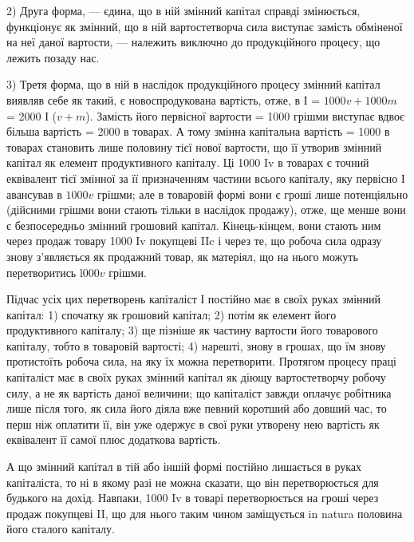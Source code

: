 2) Друга форма, — єдина, що в ній змінний капітал справді змінюється,
функціонує як змінний, що в ній вартостетворча сила виступає замість
обміненої на неї даної вартости, — належить виключно до продукційного
процесу, що лежить позаду нас.

3) Третя форма, що в ній в наслідок продукційного процесу змінний
капітал виявляв себе як такий, є новоспродукована вартість, отже,
в І = $1000 v + 1000 m$ = 2000 І ($v + m$). Замість його первісної вартости =
1000 грішми виступає вдвоє більша вартість = 2000 в товарах.
А тому змінна капітальна вартість = 1000 в товарах становить лише
половину тієї нової вартости, що її утворив змінний капітал як елемент
продуктивного капіталу. Ці 1000 Iv в товарах є точний еквівалент тієї
змінної за її призначенням частини всього капіталу, яку первісно І авансував
в $1000v$ грішми; але в товаровій формі вони є гроші лише потенціяльно
(дійсними грішми вони стають тільки в наслідок продажу), отже,
ще менше вони є безпосередньо змінний грошовий капітал. Кінець-кінцем,
вони стають ним через продаж товару 1000 Iv покупцеві IIc і через
те, що робоча сила одразу знову з’являється як продажний товар, як
матеріял, що на нього можуть перетворитись l$000v$ грішми.

Підчас усіх цих перетворень капіталіст І постійно має в своїх руках
змінний капітал: 1) спочатку як грошовий капітал; 2) потім як елемент
його продуктивного капіталу; 3) ще пізніше як частину вартости його
товарового капіталу, тобто в товаровій вартості; 4) нарешті, знову в грошах,
що їм знову протистоїть робоча сила, на яку їх можна перетворити.
Протягом процесу праці капіталіст має в своїх руках змінний капітал як
діющу вартостетворчу робочу силу, а не як вартість даної величини;
що капіталіст завжди оплачує робітника лише після того, як сила його
діяла вже певний коротший або довший час, то перш ніж оплатити її,
він уже одержує в свої руки утворену нею вартість як еквівалент її
самої плюс додаткова вартість.

А що змінний капітал в тій або іншій формі постійно
лишається в руках капіталіста, то ні в якому
разі не можна сказати, що він перетворюється для будького
на дохід. Навпаки, 1000 Iv в товарі перетворюється на гроші
через продаж покупцеві II, що для нього таким чином заміщується
in natura половина його сталого капіталу.

